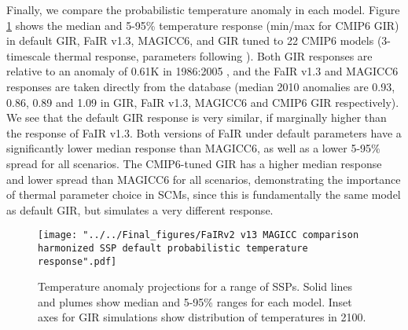 \documentclass[gmd, manuscript]{copernicus}
\begin{document}
Finally, we compare the probabilistic temperature anomaly in each model. Figure \ref{fig:SSPtemps} shows the median and 5-95\% temperature response (min/max for CMIP6 GIR) in default GIR, FaIR v1.3, MAGICC6, and GIR tuned to 22 CMIP6 models (3-timescale thermal response, parameters following \cite{Tsutsui2019}). Both GIR responses are relative to an anomaly of 0.61K in 1986:2005 \citep{Kirtman2013}, and the FaIR v1.3 and MAGICC6 responses are taken directly from the database (median 2010 anomalies are 0.93, 0.86, 0.89 and 1.09 in GIR, FaIR v1.3, MAGICC6 and CMIP6 GIR respectively). We see that the default GIR response is very similar, if marginally higher than the response of FaIR v1.3. Both versions of FaIR under default parameters have a significantly lower median response than MAGICC6, as well as a lower 5-95\% spread for all scenarios. The CMIP6-tuned GIR has a higher median response and lower spread than MAGICC6 for all scenarios, demonstrating the importance of thermal parameter choice in SCMs, since this is fundamentally the same model as default GIR, but simulates a very different response.
\begin{figure}[t]
    \texttt{[image: "../../Final\_figures/FaIRv2 v13 MAGICC comparison harmonized SSP default probabilistic temperature response".pdf]}
    \caption{Temperature anomaly projections for a range of SSPs. Solid lines and plumes show median and 5-95\% ranges for each model. Inset axes for GIR simulations show distribution of temperatures in 2100.}
    \label{fig:SSPtemps}
\end{figure}
\end{document}
